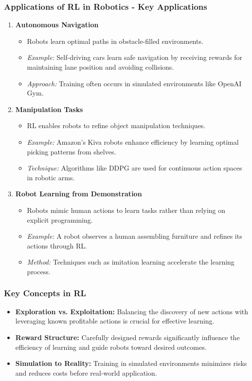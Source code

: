 \documentclass[aspectratio=169]{beamer}
\begin{document}
\begin{frame}[fragile]
    \frametitle{Applications of RL in Robotics - Key Applications}
    \begin{enumerate}
        \item \textbf{Autonomous Navigation}
            \begin{itemize}
                \item Robots learn optimal paths in obstacle-filled environments.
                \item \textit{Example:} Self-driving cars learn safe navigation by receiving rewards for maintaining lane position and avoiding collisions.
                \item \textit{Approach:} Training often occurs in simulated environments like OpenAI Gym.
            \end{itemize}
        
        \item \textbf{Manipulation Tasks}
            \begin{itemize}
                \item RL enables robots to refine object manipulation techniques.
                \item \textit{Example:} Amazon's Kiva robots enhance efficiency by learning optimal picking patterns from shelves.
                \item \textit{Technique:} Algorithms like DDPG are used for continuous action spaces in robotic arms.
            \end{itemize}
        
        \item \textbf{Robot Learning from Demonstration}
            \begin{itemize}
                \item Robots mimic human actions to learn tasks rather than relying on explicit programming.
                \item \textit{Example:} A robot observes a human assembling furniture and refines its actions through RL.
                \item \textit{Method:} Techniques such as imitation learning accelerate the learning process.
            \end{itemize}
    \end{enumerate}
\end{frame}

\begin{frame}[fragile]
    \frametitle{Key Concepts in RL}
    \begin{itemize}
        \item \textbf{Exploration vs. Exploitation:} Balancing the discovery of new actions with leveraging known profitable actions is crucial for effective learning.
        \item \textbf{Reward Structure:} Carefully designed rewards significantly influence the efficiency of learning and guide robots toward desired outcomes.
        \item \textbf{Simulation to Reality:} Training in simulated environments minimizes risks and reduces costs before real-world application.
    \end{itemize}
\end{frame}
\end{document}

